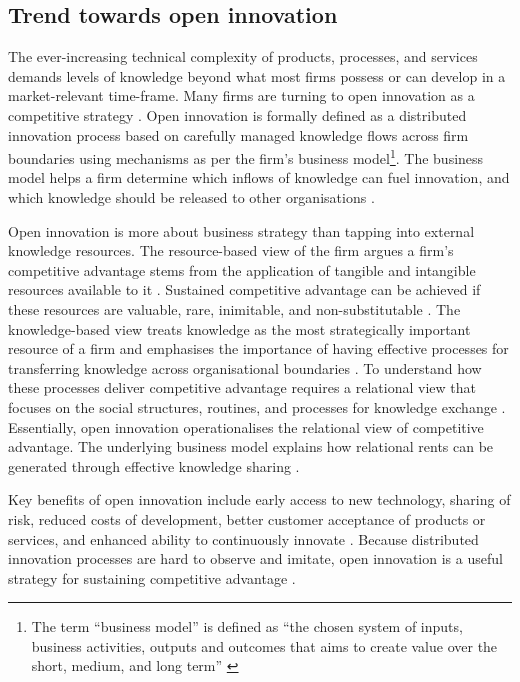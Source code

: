 \subsection{Trend towards open innovation}

The ever-increasing technical complexity of products, processes, and services demands levels of knowledge beyond what most firms possess or can develop in a market-relevant time-frame. Many firms are turning to open innovation as a competitive strategy \citep{enkel2009open,bessant2013innovation}. Open innovation is formally defined as a distributed innovation process based on carefully managed knowledge flows across firm boundaries using mechanisms as per the firm's business model\footnote{The term \enquote{business model} is defined as \enquote{the chosen system of inputs, business activities, outputs and outcomes that aims to create value over the short, medium, and long term} \citep{gould2013business}}. The business model helps a firm determine which inflows of knowledge can fuel innovation, and which knowledge should be released to other organisations \citep{chesbrough2017future}. \medskip 

Open innovation is more about business strategy than tapping into external knowledge resources. The resource-based view of the firm argues a firm's competitive advantage stems from the application of tangible and intangible resources available to it \citep{wernerfelt1984resource,peteraf1993cornerstones}. Sustained competitive advantage can be achieved if these resources are valuable, rare, inimitable, and non-substitutable \citep{barney1991firm}. The knowledge-based view treats knowledge as the most strategically important resource of a firm and emphasises the importance of having effective processes for transferring knowledge across organisational boundaries \citep{kogut1992knowledge,drucker1994post,grant1996toward}. To understand how these processes deliver competitive advantage requires a relational view that focuses on the social structures, routines, and processes for knowledge exchange \citep{dyer1998relational}. Essentially, open innovation operationalises the relational view of competitive advantage. The underlying business model explains how relational rents can be generated through effective knowledge sharing \citep{dyer1998relational,lavie2006competitive}. \medskip

Key benefits of open innovation include early access to new technology, sharing of risk, reduced costs of development, better customer acceptance of products or services, and enhanced ability to continuously innovate \citep{ye2013exploring}. Because distributed innovation processes are hard to observe and imitate, open innovation is a useful strategy for sustaining competitive advantage \citep{barney1991firm,lichtenthaler2011open}. \medskip

